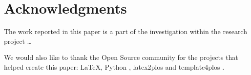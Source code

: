 \section*{Acknowledgments}

The work reported in this paper is a part of the investigation within the research project \ldots

We would also like to thank the Open Source community for the projects that helped create this paper: \LaTeX \cite{LaTeX}, Python \cite{Python}, latex2plos \cite{latex2plos} and template4plos \cite{template4plos}.
